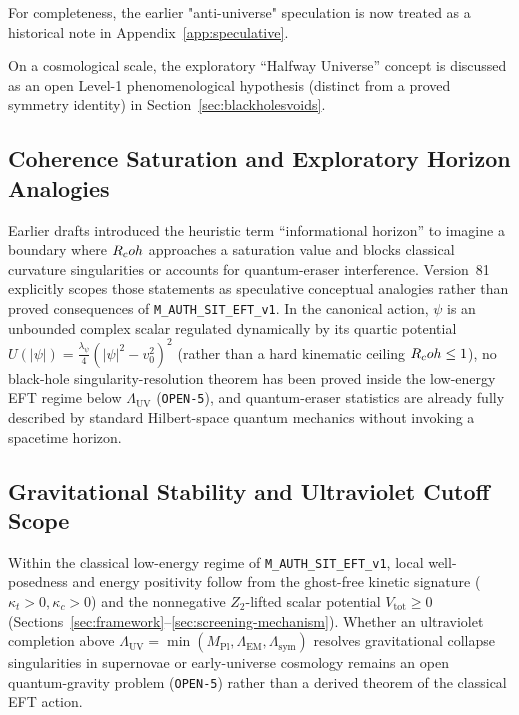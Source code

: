 For completeness, the earlier "anti-universe" speculation is now treated as a historical note in Appendix~\ref{app:speculative}.

On a cosmological scale, the exploratory ``Halfway Universe'' concept is discussed as an open Level-1 phenomenological hypothesis (distinct from a proved symmetry identity) in Section~\ref{sec:blackholesvoids}.

\subsection{Coherence Saturation and Exploratory Horizon Analogies}
\label{sec:info-horizons}

Earlier drafts introduced the heuristic term ``informational horizon'' to imagine a boundary where $R_coh$ approaches a saturation value and blocks classical curvature singularities or accounts for quantum-eraser interference. Version~81 explicitly scopes those statements as speculative conceptual analogies rather than proved consequences of \texttt{M\_AUTH\_SIT\_EFT\_v1}. In the canonical action, $\psi$ is an unbounded complex scalar regulated dynamically by its quartic potential $U(|\psi|) = \frac{\lambda_\psi}{4}(|\psi|^2 - v_0^2)^2$ (rather than a hard kinematic ceiling $R_coh \le 1$), no black-hole singularity-resolution theorem has been proved inside the low-energy EFT regime below $\Lambda_{\mathrm{UV}}$ (\texttt{OPEN-5}), and quantum-eraser statistics are already fully described by standard Hilbert-space quantum mechanics without invoking a spacetime horizon.

\subsection{Gravitational Stability and Ultraviolet Cutoff Scope}
\label{sec:grav-stability}

Within the classical low-energy regime of \texttt{M\_AUTH\_SIT\_EFT\_v1}, local well-posedness and energy positivity follow from the ghost-free kinetic signature ($\kappa_t > 0, \kappa_c > 0$) and the nonnegative $Z_2$-lifted scalar potential $V_{\mathrm{tot}} \ge 0$ (Sections~\ref{sec:framework}--\ref{sec:screening-mechanism}). Whether an ultraviolet completion above $\Lambda_{\mathrm{UV}} = \min(M_{\mathrm{Pl}}, \Lambda_{\mathrm{EM}}, \Lambda_{\mathrm{sym}})$ resolves gravitational collapse singularities in supernovae or early-universe cosmology remains an open quantum-gravity problem (\texttt{OPEN-5}) rather than a derived theorem of the classical EFT action.

